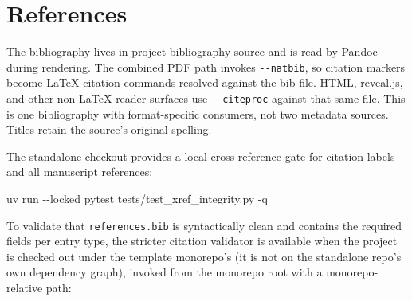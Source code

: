 \documentclass[
  english,
]{article}
\newenvironment{Shaded}{}{}
\newcommand{\AttributeTok}[1]{\textcolor[rgb]{0.49,0.56,0.16}{#1}}
\newcommand{\DataTypeTok}[1]{\textcolor[rgb]{0.56,0.13,0.00}{#1}}
\newcommand{\ExtensionTok}[1]{#1}
\newcommand{\NormalTok}[1]{#1}
\newcommand{\OperatorTok}[1]{\textcolor[rgb]{0.40,0.40,0.40}{#1}}
\newcommand{\StringTok}[1]{\textcolor[rgb]{0.25,0.44,0.63}{#1}}
\newcommand{\VariableTok}[1]{\textcolor[rgb]{0.10,0.09,0.49}{#1}}
\theoremstyle{plain}
\theoremstyle{definition}
\theoremstyle{remark}
\theoremstyle{definition}
\begin{document}
\section{References}\label{sec:references}

The bibliography lives in
\href{https://github.com/ActiveInferenceInstitute/Active_Fedference/blob/main/manuscript/references.bib}{project
bibliography source} and is read by Pandoc during rendering. The
combined PDF path invokes \texttt{-\/-natbib}, so citation markers
become LaTeX citation commands resolved against the bib file. HTML,
reveal.js, and other non-LaTeX reader surfaces use \texttt{-\/-citeproc}
against that same file. This is one bibliography with format-specific
consumers, not two metadata sources. Titles retain the source's original
spelling.

The standalone checkout provides a local cross-reference gate for
citation labels and all manuscript references:

\begin{Shaded}
\begin{Highlighting}[]
\ExtensionTok{uv}\NormalTok{ run }\AttributeTok{{-}{-}locked}\NormalTok{ pytest tests/test\_xref\_integrity.py }\AttributeTok{{-}q}
\end{Highlighting}
\end{Shaded}

To validate that \texttt{references.bib} is syntactically clean and
contains the required fields per entry type, the stricter citation
validator is available when the project is checked out under the
template monorepo's  (it is not on the
standalone repo's own dependency graph), invoked from the monorepo root
with a monorepo-relative path:

\begin{Shaded}
\end{Shaded}




\providecommand{\bibsection}{}
\renewcommand{\bibsection}{}


\end{document}
